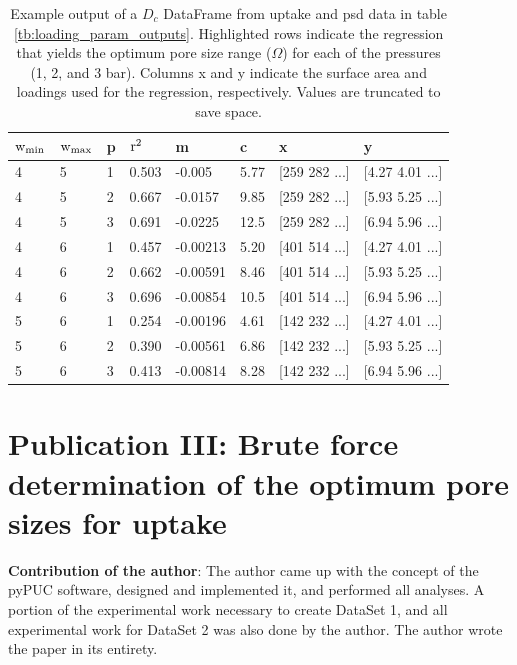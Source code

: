 \begin{table}[h!]
    \centering
    \begin{tabular}{l|l|l|l|l|l|l|l}
        $\rm w_{min}$ & $\rm w_{max}$ & p & $\rm r^2$ & m & c & x & y \\
        \midrule
        \rowcolor{yellow} 4 & 5 & 1 & 0.503 & -0.005 & 5.77 & [259 282 ...] & [4.27 4.01 ...] \\
        \rowcolor{yellow} 4 & 5 & 2 & 0.667 & -0.0157	& 9.85 & [259 282 ...] & [5.93 5.25 ...] \\
        4 & 5 & 3 & 0.691 & -0.0225 & 12.5 & [259 282 ...] & [6.94 5.96 ...] \\
        4 & 6 & 1 & 0.457 & -0.00213 & 5.20 & [401 514 ...] & [4.27 4.01 ...] \\
        4 &	6 & 2 & 0.662 & -0.00591 & 8.46	& [401 514 ...] & [5.93 5.25 ...] \\
        \rowcolor{yellow} 4 &	6 & 3 &	0.696 & -0.00854 & 10.5 & [401 514 ...] & [6.94 5.96 ...] \\
        5 & 6 & 1 & 0.254 & -0.00196 & 4.61 & [142 232 ...] & [4.27 4.01 ...] \\
        5 & 6 & 2 & 0.390 & -0.00561 & 6.86 & [142 232 ...] & [5.93 5.25 ...] \\
        5 & 6 & 3 & 0.413 & -0.00814 & 8.28 & [142 232 ...] & [6.94 5.96 ...] \\
    \end{tabular}
    \caption{Example output of a $D_c$ DataFrame from  uptake and \acrshort{psd} data in table \ref{tb:loading_param_outputs}. Highlighted rows indicate the regression that yields the optimum pore size range ($\Omega$) for each of the pressures (1, 2, and 3 bar). Columns x and y indicate the surface area and loadings used for the regression, respectively. Values are truncated to save space.}
    \label{tb:D_c}
\end{table}

\newpage
\section[Publication III]{\texorpdfstring{Publication III: Brute force determination of the optimum pore sizes for
 uptake}{Publication III: Brute force determination of the optimum pore sizes for
CO2 uptake}}

\textbf{Contribution of the author}: The author came up with the concept of the pyPUC software, designed and implemented it, and performed all analyses. A portion of the experimental work necessary to create DataSet 1, and all experimental work for DataSet 2 was also done by the author. The author wrote the paper in its entirety.

